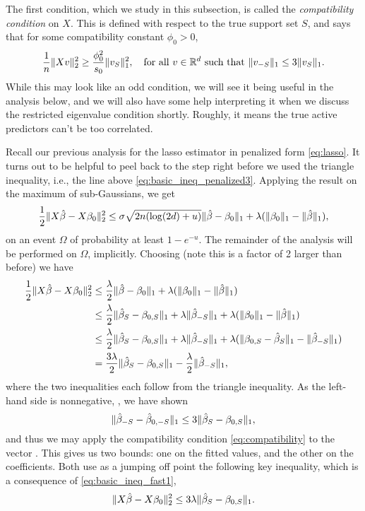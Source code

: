 \documentclass{article}
\begin{document}
The first condition, which we study in this subsection, is called the
\emph{compatibility condition} on $X$. This is defined with respect to the true
support set $S$, and says that for some compatibility constant $\phi_0>0$,   
\begin{equation}
\label{eq:compatibility}
\frac{1}{n}\|Xv\|_2^2 \geq \frac{\phi_0^2}{s_0} \|v_{S}\|_1^2, \quad  
\text{for all $v \in \mathbb{R}^d$ such that $\|v_{-S}\|_1 \leq 3 \|v_{S}\|_1$}.  
\end{equation}
While this may look like an odd condition, we will see it being useful in the
analysis below, and we will also have some help interpreting it when we discuss
the restricted eigenvalue condition shortly. Roughly, it means the true active
predictors can't be too correlated.  

Recall our previous analysis for the lasso estimator in penalized form
\eqref{eq:lasso}. It turns out to be helpful to peel back to the step right
before we used the triangle inequality, i.e., the line above
\eqref{eq:basic_ineq_penalized3}. Applying the result on the maximum of    
sub-Gaussians, we get 
\[
\frac{1}{2} \|X\hat{\beta} - X\beta_0\|_2^2 \leq \sigma \sqrt{2n (\log(2d) + u)}  
\|\hat{\beta} - \beta_0\|_1 + \lambda (\|\beta_0\|_1 - \|\hat{\beta}\|_1),
\]
on an event $\Omega$ of probability at least $1-e^{-u}$. The remainder of the
analysis will be performed on $\Omega$, implicitly. Choosing  (note this is a factor of 2 larger
than before) we have  
\begin{align}
\nonumber
\frac{1}{2} \|X\hat{\beta} - X\beta_0\|_2^2 
&\leq \frac{\lambda}{2} \|\hat{\beta} - \beta_0\|_1 + 
  \lambda( \|\beta_0\|_1 - \|\hat{\beta}\|_1) \\ 
\nonumber
&\leq \frac{\lambda}{2} \|\hat{\beta}_S - \beta_{0,S}\|_1 + \lambda \|\hat{\beta}_{-S}\|_1
  + \lambda( \|\beta_0\|_1 - \|\hat{\beta}\|_1) \\
\nonumber
&\leq \frac{\lambda}{2} \|\hat{\beta}_S - \beta_{0,S}\|_1 + \lambda \|\hat{\beta}_{-S}\|_1
  + \lambda( \|\beta_{0,S}-\hat{\beta}_S\|_1 - \|\hat{\beta}_{-S}\|_1) \\ 
\label{eq:basic_ineq_fast1}
&= \frac{3\lambda}{2} \|\hat{\beta}_S - \beta_{0,S}\|_1 - 
  \frac{\lambda}{2} \|\hat{\beta}_{-S}\|_1,  
\end{align}
where the two inequalities each follow from the triangle inequality. As the
left-hand side is nonnegative, , we
have shown  
\[
\|\hat{\beta}_{-S} - \hat{\beta}_{0,-S} \|_1 \leq 3 \|\hat{\beta}_S - \beta_{0,S}\|_1,  
\]
and thus we may apply the compatibility condition \eqref{eq:compatibility} to
the vector . This gives us two bounds: one on the
fitted values, and the other on the coefficients. Both use as a jumping off
point the following key inequality, which is a consequence of
\eqref{eq:basic_ineq_fast1},  
\begin{equation}
\label{eq:basic_ineq_fast2}
\|X\hat{\beta} - X\beta_0\|_2^2 \leq 3\lambda \|\hat{\beta}_S - \beta_{0,S}\|_1.   
\end{equation}
\end{document}
